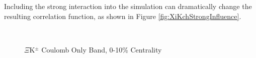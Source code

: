 \documentclass[../AnalysisNoteJBuxton.tex]{subfiles}
\begin{document}
Including the strong interaction into the simulation can dramatically change the resulting correlation function, as shown in Figure \ref{fig:XiKchStrongInfluence}.


\begin{figure}[h]
  \centering
  \\
  \caption[$\Xi$K$^{\pm}$ Coulomb Only Band]{$\Xi$K$^{\pm}$ Coulomb Only Band, 0-10\% Centrality}
  \label{fig:XiKchCoulombOnlyBand}
\end{figure}
\end{document}

